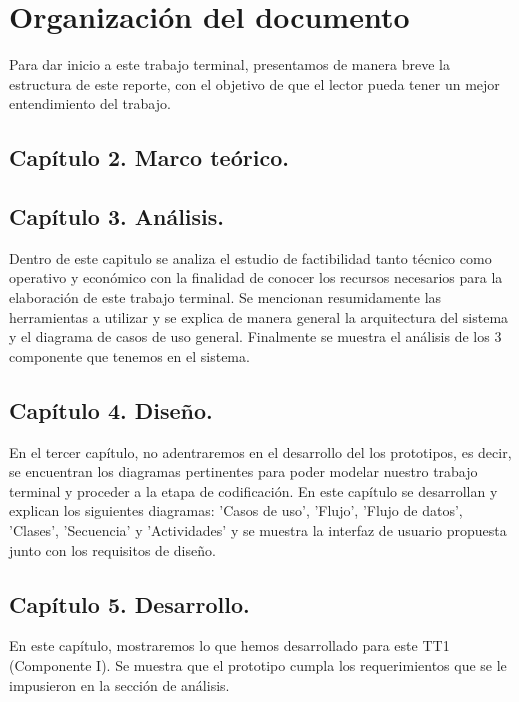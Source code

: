 \documentclass[12pt, a4paper, titlepage]{report}
\begin{document}
        \section{Organización del documento}
            Para dar inicio a este trabajo terminal, presentamos de manera breve la estructura de este reporte, con el objetivo de que el lector pueda tener un mejor entendimiento del trabajo.
            

            \subsection{Capítulo 2. Marco teórico.}
                \lipsum[4]
             
            \subsection{Capítulo 3. Análisis.}
                Dentro de este capitulo se analiza el estudio de factibilidad tanto t\'ecnico como operativo y económico con la finalidad de conocer los recursos necesarios para la elaboración de este trabajo terminal. Se mencionan resumidamente las herramientas a utilizar y se explica de manera general la arquitectura del sistema  y el diagrama de casos de uso general. Finalmente se muestra el análisis de los 3 componente que tenemos en el sistema.
             
            \subsection{Capítulo 4. Diseño.}
                En el tercer capítulo, no adentraremos en el desarrollo del los prototipos, es decir, se encuentran los diagramas pertinentes para poder modelar nuestro trabajo terminal y proceder a la etapa de codificación. En este capítulo se desarrollan y explican los siguientes diagramas: 'Casos de uso', 'Flujo', 'Flujo de datos', 'Clases', 'Secuencia' y 'Actividades' y se muestra la interfaz de usuario propuesta junto con los requisitos de diseño.
                
            \subsection{Capítulo 5. Desarrollo.}
                En este capítulo, mostraremos lo que hemos desarrollado para este TT1 (Componente I). Se muestra que el prototipo cumpla los requerimientos que se le impusieron en la sección de análisis.
            
\end{document}
